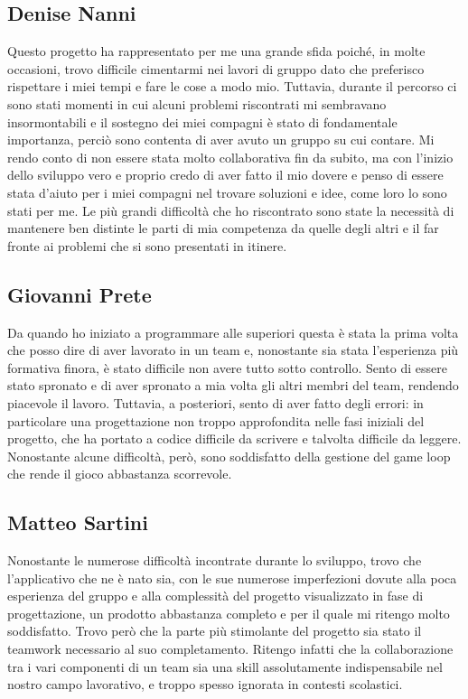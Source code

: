 \documentclass[a4paper,12pt]{report}
\begin{document}
\subsection{Denise Nanni}
Questo progetto ha rappresentato per me una grande sfida poiché, in molte occasioni, trovo difficile cimentarmi nei lavori di gruppo dato che preferisco rispettare i miei tempi e fare le cose a modo mio. Tuttavia, durante il percorso ci sono stati momenti in cui alcuni problemi riscontrati mi sembravano insormontabili e il sostegno dei miei compagni è stato di fondamentale importanza, perciò sono contenta di aver avuto un gruppo su cui contare.
Mi rendo conto di non essere stata molto collaborativa fin da subito, ma con l'inizio dello sviluppo vero e proprio credo di aver fatto il mio dovere e penso di essere stata d'aiuto per i miei compagni nel trovare soluzioni e idee, come loro lo sono stati per me.
Le più grandi difficoltà che ho riscontrato sono state la necessità di mantenere ben distinte le parti di mia competenza da quelle degli altri e il far fronte ai problemi che si sono presentati in itinere.\\
\subsection{Giovanni Prete}
Da quando ho iniziato a programmare alle superiori questa è stata la prima volta che posso dire di aver lavorato in un team e, nonostante sia stata l'esperienza più formativa finora, è stato difficile non avere tutto sotto controllo. Sento di essere stato spronato e di aver spronato a mia volta gli altri membri del team, rendendo piacevole il lavoro. Tuttavia, a posteriori, sento di aver fatto degli errori: in particolare una progettazione non troppo approfondita nelle fasi iniziali del progetto, che ha portato a codice difficile da scrivere e talvolta difficile da leggere. Nonostante alcune difficoltà, però, sono soddisfatto della gestione del game loop che rende il gioco abbastanza scorrevole.\\
\subsection{Matteo Sartini}
Nonostante le numerose difficoltà incontrate durante lo sviluppo, trovo che l’applicativo che ne è nato sia, con le sue numerose imperfezioni dovute alla poca esperienza del gruppo e alla complessità del progetto visualizzato in fase di progettazione, un prodotto abbastanza completo e per il quale mi ritengo molto soddisfatto.
Trovo però che la parte più stimolante del progetto sia stato il teamwork necessario al suo completamento. Ritengo infatti che la collaborazione tra i vari componenti di un team sia una skill assolutamente indispensabile nel nostro campo lavorativo, e troppo spesso ignorata in contesti scolastici.\\
\end{document}
